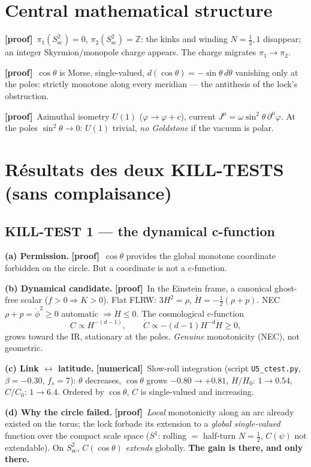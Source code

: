 \documentclass[11pt]{article}
\newcommand{\preuve}{{\small\textbf{[proof]}}}
\newcommand{\num}{{\small\textbf{[numerical]}}}
\newcommand{\Stwo}{S^2_{\text{sc}}}
\theoremstyle{definition}
\begin{document}
\section{Central mathematical structure}
\preuve\ $\pi_1(\Stwo)=0$, $\pi_2(\Stwo)=\mathbb{Z}$: the kinks and winding $N=\tfrac12,1$
disappear; an integer Skyrmion/monopole charge appears. The charge migrates $\pi_1\to\pi_2$.

\preuve\ $\cos\theta$ is Morse, single-valued, $d(\cos\theta)=-\sin\theta\,d\theta$ vanishing only at the
poles: strictly monotone along every meridian --- the antithesis of the lock's obstruction.

\preuve\ Azimuthal isometry $U(1)$ ($\varphi\to\varphi+c$), current
$J^\mu=\omega\sin^2\!\theta\,\partial^\mu\varphi$. At the poles $\sin^2\!\theta\to0$: $U(1)$ trivial,
\emph{no Goldstone} if the vacuum is polar.

\section{R\'esultats des deux KILL-TESTS (sans complaisance)}

\subsection{KILL-TEST 1 --- the dynamical c-function}
\textbf{(a) Permission.} \preuve\ $\cos\theta$ provides the global monotone coordinate forbidden on the
circle. But a coordinate is not a c-function.

\textbf{(b) Dynamical candidate.} \preuve\ In the Einstein frame, a canonical ghost-free scalar
($f>0\Rightarrow K>0$). Flat FLRW: $3H^2=\rho$, $\dot H=-\tfrac12(\rho+p)$. NEC $\rho+p=\dot\phi^2\ge0$
automatic $\Rightarrow\dot H\le0$. The cosmological c-function~\cite{FGPW1999}
\begin{equation}\label{eq:Cdef}
C\propto H^{-(d-1)},\qquad \dot C\propto-(d-1)H^{-d}\dot H\ge0,
\end{equation}
grows toward the IR, stationary at the poles. \emph{Genuine} monotonicity (NEC), not geometric.

\textbf{(c) Link $\leftrightarrow$ latitude.} \num\ Slow-roll integration (script
\texttt{U5\_ctest.py}, $\beta=-0.30$, $f_s=7$): $\theta$ decreases, $\cos\theta$ grows
$-0.80\to+0.81$, $H/H_0$: $1\to0.54$, $C/C_0$: $1\to6.4$. Ordered by $\cos\theta$, $C$ is
single-valued and increasing.

\textbf{(d) Why the circle failed.} \preuve\ \emph{Local} monotonicity along an arc already existed on the
torus; the lock forbade its extension to a \emph{global single-valued} function over the compact scale
space ($S^1$: rolling $=$ half-turn $N=\tfrac12$, $C(\psi)$ not extendable). On $\Stwo$, $C(\cos\theta)$
\emph{extends} globally. \textbf{The gain is there, and only there.}
\end{document}
